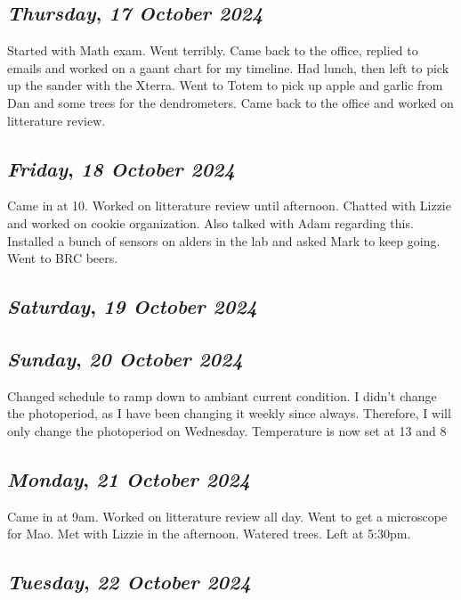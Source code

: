 \def\day{\textit{17 October 2024}}
\def\weekday{\textit{Thursday}}
\subsection*{\weekday, \day}
Started with Math exam. Went terribly. Came back to the office, replied to emails and worked on a gaant chart for my timeline. Had lunch, then left to pick up the sander with the Xterra. Went to Totem to pick up apple and garlic from Dan and some trees for the dendrometers. Came back to the office and worked on litterature review. 

\def\day{\textit{18 October 2024}}
\def\weekday{\textit{Friday}}
\subsection*{\weekday, \day}
Came in at 10. Worked on litterature review until afternoon. Chatted with Lizzie and worked on cookie organization. Also talked with Adam regarding this. Installed a bunch of sensors on alders in the lab and asked Mark to keep going. Went to BRC beers. 
\def\day{\textit{19 October 2024}}
\def\weekday{\textit{Saturday}}
\subsection*{\weekday, \day}

\def\day{\textit{20 October 2024}}
\def\weekday{\textit{Sunday}}
\subsection*{\weekday, \day}
Changed schedule to ramp down to ambiant current condition. I didn't change the photoperiod, as I have been changing it weekly since always. Therefore, I will only change the photoperiod on Wednesday. Temperature is now set at 13 and 8

\def\day{\textit{21 October 2024}}
\def\weekday{\textit{Monday}}
\subsection*{\weekday, \day}
Came in at 9am. Worked on litterature review all day. Went to get a microscope for Mao. Met with Lizzie in the afternoon. Watered trees. Left at 5:30pm. 
\def\day{\textit{22 October 2024}}
\def\weekday{\textit{Tuesday}}
\subsection*{\weekday, \day}

